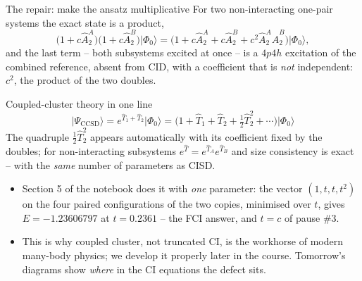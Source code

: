 \documentclass[aspectratio=169,10pt]{beamer}
\newcommand{\ket}[1]{\vert #1\rangle}
\begin{document}
\begin{frame}{The repair: make the ansatz multiplicative}
  \small
  For two non-interacting one-pair systems the exact state is a product,
  \[
    \bigl(1+c\hat{A}_2^A\bigr)\bigl(1+c\hat{A}_2^B\bigr)\ket{\Phi_0}
    =\bigl(1+c\hat{A}_2^A+c\hat{A}_2^B+c^2\hat{A}_2^A\hat{A}_2^B\bigr)\ket{\Phi_0},
  \]
  and the last term -- both subsystems excited at once -- is a $4p4h$ excitation of the combined reference, absent from CID, with a coefficient that is \emph{not} independent: $c^2$, the product of the two doubles.
  \begin{block}{Coupled-cluster theory in one line}
    \[
      \ket{\Psi_{\mathrm{CCSD}}}=e^{\hat{T}_1+\hat{T}_2}\ket{\Phi_0}
      =\bigl(1+\hat{T}_1+\hat{T}_2+\tfrac12\hat{T}_2^2+\cdots\bigr)\ket{\Phi_0}
    \]
    The quadruple $\tfrac12\hat{T}_2^2$ appears automatically with its coefficient fixed by the doubles; for non-interacting subsystems $e^{\hat{T}}=e^{\hat{T}_A}e^{\hat{T}_B}$ and size consistency is exact -- with the \emph{same} number of parameters as CISD.
  \end{block}
  \begin{itemize}
    \item Section 5 of the notebook does it with \emph{one} parameter: the vector $(1,t,t,t^2)$ on the four paired configurations of the two copies, minimised over $t$, gives $E=-1.23606797$ at $t=0.2361$ -- the FCI answer, and $t=c$ of pause \#3.
    \item This is why coupled cluster, not truncated CI, is the workhorse of modern many-body physics; we develop it properly later in the course. Tomorrow's diagrams show \emph{where} in the CI equations the defect sits.
  \end{itemize}
\end{frame}
\end{document}
